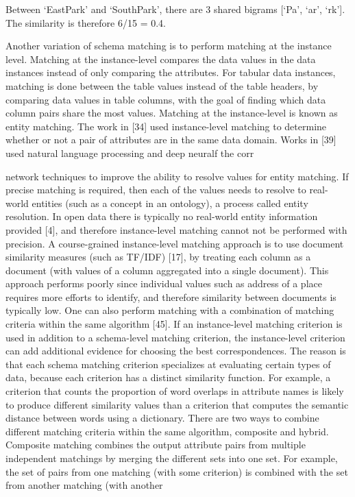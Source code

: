 Between `EastPark' and `SouthPark', there are 3 shared bigrams [`Pa', `ar', `rk']. The similarity is therefore 6/15 = 0.4.

Another variation of schema matching is to perform matching at the instance level. Matching at the instance-level compares the data values in the data instances instead of only comparing the attributes. For tabular data instances, matching is done between the table values instead of the table headers, by comparing data values in table columns, with the goal of finding which data column pairs share the most values. Matching at the instance-level is known as entity matching. The work in \cite{Mudgal2018Deep}[34] used instance-level matching to determine whether or not a pair of attributes are in the same data domain. Works in \cite{Rahm2016Case}[39] used natural language processing and deep neuralf the corr

network techniques to improve the ability to resolve values for entity matching. If precise matching is required, then each of the values needs to resolve to real-world entities (such as a concept in an ontology), a process called entity resolution. In open data there is typically no real-world entity information provided \cite{books/sp/bellahsene11}[4], and therefore instance-level matching cannot not be performed with precision. A course-grained instance-level matching approach is to use document similarity measures (such as TF/IDF) \cite{Duchateau2009YAM}[17], by treating each column as a document (with values of a column aggregated into a single document). This approach performs poorly since individual values such as address of a place requires more efforts to identify, and therefore similarity between documents is typically low.
One can also perform matching with a combination of matching criteria within the same algorithm \cite{Sorrentino2011NORMS}[45]. If an instance-level matching criterion is used in addition to a schema-level matching criterion, the instance-level criterion can add additional evidence for choosing the best correspondences. The reason is that each schema matching criterion specializes at evaluating certain types of data, because each criterion has a distinct similarity function. For example, a criterion that counts the proportion of word overlaps in attribute names is likely to produce different similarity values than a criterion that computes the semantic distance between words using a dictionary.
There are two ways to combine different matching criteria within the same algorithm, composite and hybrid. Composite matching combines the output attribute pairs from multiple independent matchings by merging the different sets into one set. For example, the set of pairs from one matching (with some criterion) is combined with the set from another matching (with another

